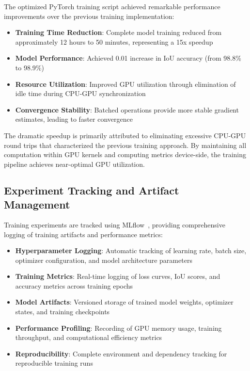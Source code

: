 The optimized PyTorch training script achieved remarkable performance improvements over the previous training implementation:

\begin{itemize}
\item \textbf{Training Time Reduction}: Complete model training reduced from approximately 12 hours to 50 minutes, representing a 15x speedup
\item \textbf{Model Performance}: Achieved 0.01 increase in IoU accuracy (from 98.8\% to 98.9\%)
\item \textbf{Resource Utilization}: Improved GPU utilization through elimination of idle time during CPU-GPU synchronization
\item \textbf{Convergence Stability}: Batched operations provide more stable gradient estimates, leading to faster convergence
\end{itemize}

The dramatic speedup is primarily attributed to eliminating excessive CPU-GPU round trips that characterized the previous training approach. By maintaining all computation within GPU kernels and computing metrics device-side, the training pipeline achieves near-optimal GPU utilization.

\subsection{Experiment Tracking and Artifact Management}\label{subsec:experiment-tracking}

Training experiments are tracked using MLflow~\cite{mlflow2018}, providing comprehensive logging of training artifacts and performance metrics:

\begin{itemize}
\item \textbf{Hyperparameter Logging}: Automatic tracking of learning rate, batch size, optimizer configuration, and model architecture parameters
\item \textbf{Training Metrics}: Real-time logging of loss curves, IoU scores, and accuracy metrics across training epochs
\item \textbf{Model Artifacts}: Versioned storage of trained model weights, optimizer states, and training checkpoints
\item \textbf{Performance Profiling}: Recording of GPU memory usage, training throughput, and computational efficiency metrics
\item \textbf{Reproducibility}: Complete environment and dependency tracking for reproducible training runs
\end{itemize}

